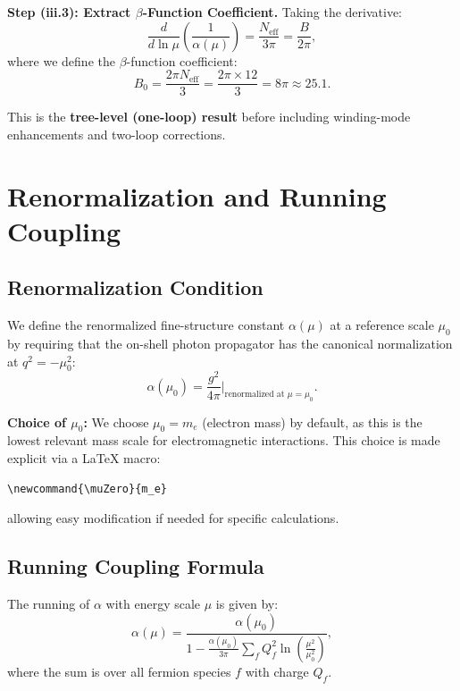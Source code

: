 \documentclass[11pt,a4paper]{article}
\theoremstyle{remark}
\begin{document}
\textbf{Step (iii.3): Extract $\beta$-Function Coefficient.} Taking the derivative:
\begin{equation}
\frac{d}{d \ln \mu} \left( \frac{1}{\alpha(\mu)} \right) = \frac{N_{\text{eff}}}{3\pi} = \frac{B}{2\pi},
\label{eq:beta-extraction}
\end{equation}
where we define the $\beta$-function coefficient:
\begin{equation}
B_0 = \frac{2\pi N_{\text{eff}}}{3} = \frac{2\pi \times 12}{3} = 8\pi \approx 25.1.
\label{eq:B0-definition}
\end{equation}

This is the \textbf{tree-level (one-loop) result} before including winding-mode enhancements and two-loop corrections.

\section{Renormalization and Running Coupling}
\label{sec:renormalization}

\subsection{Renormalization Condition}

We define the renormalized fine-structure constant $\alpha(\mu)$ at a reference scale $\mu_0$ by requiring that the on-shell photon propagator has the canonical normalization at $q^2 = -\mu_0^2$:
\begin{equation}
\alpha(\mu_0) = \frac{g^2}{4\pi} \Big|_{\text{renormalized at } \mu = \mu_0}.
\label{eq:alpha-definition}
\end{equation}

\textbf{Choice of $\mu_0$:} We choose $\mu_0 = m_e$ (electron mass) by default, as this is the lowest relevant mass scale for electromagnetic interactions. This choice is made explicit via a LaTeX macro:
\begin{verbatim}
\newcommand{\muZero}{m_e}
\end{verbatim}
allowing easy modification if needed for specific calculations.

\subsection{Running Coupling Formula}

The running of $\alpha$ with energy scale $\mu$ is given by:
\begin{equation}
\alpha(\mu) = \frac{\alpha(\mu_0)}{1 - \frac{\alpha(\mu_0)}{3\pi} \sum_f Q_f^2 \ln\left(\frac{\mu^2}{\mu_0^2}\right)},
\label{eq:alpha-running-simple}
\end{equation}
where the sum is over all fermion species $f$ with charge $Q_f$.
\end{document}
